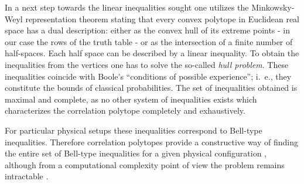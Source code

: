 \documentclass[pra,amsmath,amsfonts,showkeys,showpacs,preprint]{revtex4}
\begin{document}
In a next step towards the linear inequalities sought one utilizes the
Minkowsky-Weyl representation theorem \cite[p.29]{ziegler94} stating
that every convex polytope in Euclidean real space has a dual
description: either as the convex hull of its extreme points -
in our case the rows of the truth table -  or as the intersection of a
finite number of half-spaces. Each half space can be described by a linear
inequality.
To obtain the inequalities from the vertices one has to solve the
so-called \emph{hull problem}. These inequalities coincide with Boole's
``conditions of possible experience'';
 i.~e., they constitute the
bounds of classical probabilities.
The set of inequalities obtained
is maximal and
complete, as no other system of inequalities exists which
characterizes the correlation polytope completely and exhaustively.

For particular physical setups these inequalities correspond to
Bell-type inequalities. Therefore correlation
polytopes provide a constructive way of finding the entire set of
Bell-type inequalities for a given physical configuration
\cite{pitowsky01,filipp01}, although from a computational complexity
point of view the problem remains intractable \cite{pitowsky91}.
\end{document}
